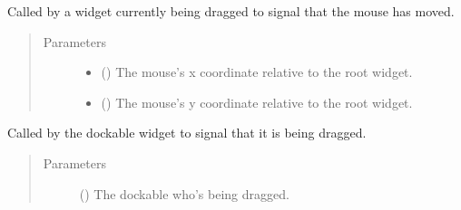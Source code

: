 \documentclass[letterpaper,10pt,english,openany,oneside]{sphinxmanual}
\begin{document}
\begin{fulllineitems}
\begin{fulllineitems}
\begin{quote}
\begin{description}
\end{description}\end{quote}

\end{fulllineitems}


\begin{fulllineitems}
\label{\detokenize{api:spookyconsole.gui.core.Grid.signal_drag_motion}}
Called by a  widget currently being dragged to signal that the mouse has moved.
\begin{quote}\begin{description}
\item[{Parameters}] \leavevmode\begin{itemize}
\item {} 
 () \textendash{} The mouse’s x coordinate relative to the root widget.

\item {} 
 () \textendash{} The mouse’s y coordinate relative to the root widget.

\end{itemize}

\end{description}\end{quote}

\end{fulllineitems}


\begin{fulllineitems}
\label{\detokenize{api:spookyconsole.gui.core.Grid.signal_drag_start}}
Called by the  dockable widget to signal that it is being dragged.
\begin{quote}\begin{description}
\item[{Parameters}] \leavevmode
{} () \textendash{} The dockable who’s being dragged.


\end{description}
\end{quote}
\end{fulllineitems}
\end{fulllineitems}
\end{document}
